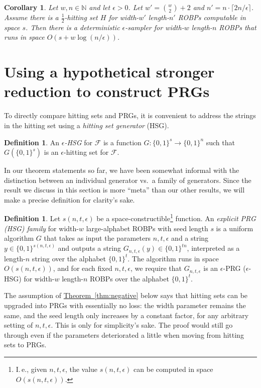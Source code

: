 \documentclass[11pt]{article}
\numberwithin{equation}{section}
\newtheorem{corollary}[theorem]{Corollary}
\theoremstyle{definition}
\newtheorem{definition}[theorem]{Definition}
\theoremstyle{plain}
\newcommand{\N}{\mathbb N}
\newcommand{\expref}[2]{\hyperref[#2]{#1~\ref{#2}}}
\begin{document}
\begin{corollary} \label{cor:const-width-main-generalization}
Let $w, n \in \N$ and let $\epsilon > 0$. Let $w' = \binom{w}{2} + 2$ and $n' = n \cdot \lceil 2n / \epsilon \rceil$. Assume there is a $\frac{1}{2}$-hitting set $H$ for width-$w'$ length-$n'$ ROBPs computable in space $s$. Then there is a deterministic $\epsilon$-sampler for width-$w$ length-$n$ ROBPs that runs in space $O(s + w \log(n/\epsilon))$.
\end{corollary}

\section{Using a hypothetical stronger reduction to construct PRGs} \label{sec:negative}

To directly compare hitting sets and PRGs, it is convenient to address the strings in the hitting set using a \emph{hitting set generator} (HSG).

\begin{definition}
An \emph{$\epsilon$-HSG} for $\mathcal{F}$ is a function $G \colon \{0, 1\}^s \to \{0, 1\}^n$ such that $G(\{0, 1\}^s)$ is an $\epsilon$-hitting set for $\mathcal{F}$.
\end{definition}

In our theorem statements so far, we have been somewhat informal with the distinction between an individual generator vs.\ a family of generators. Since the result we discuss in this section is more ``meta'' than our other results, we will make a precise definition for clarity's sake.

\begin{definition}
Let $s(n, t, \epsilon)$ be a space-constructible\footnote{I.\,e., given $n, t, \epsilon$, the value $s(n, t, \epsilon)$ can be computed in space $O(s(n, t, \epsilon))$.} function. An \emph{explicit PRG (HSG) family} for width-$w$ large-alphabet ROBPs with seed length $s$ is a uniform algorithm $G$ that takes as input the parameters $n, t, \epsilon$ and a string $y \in \{0, 1\}^{s(n, t, \epsilon)}$ and outputs a string $G_{n, t, \epsilon}(y) \in \{0, 1\}^{tn}$, interpreted as a length-$n$ string over the alphabet $\{0, 1\}^t$. The algorithm runs in space $O(s(n, t, \epsilon))$, and for each fixed $n, t, \epsilon$, we require that $G_{n, t, \epsilon}$ is an $\epsilon$-PRG ($\epsilon$-HSG) for width-$w$ length-$n$ ROBPs over the alphabet $\{0, 1\}^t$.
\end{definition}

The assumption of \expref{Theorem}{thm:negative} below says that hitting sets can be upgraded into PRGs with essentially no loss: the width parameter remains the same, and the seed length only increases by a constant factor, for any arbitrary setting of $n, t, \epsilon$. This is only for simplicity's sake. The proof would still go through even if the parameters deteriorated a little when moving from hitting sets to PRGs.
\end{document}
